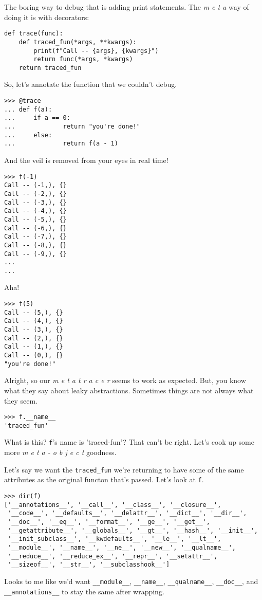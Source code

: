 \documentclass[11pt]{article}
\begin{document}
The boring way to debug that is adding print statements. The \emph{m e t
a} way of doing it is with decorators:
\begin{verbatim}
def trace(func):
    def traced_fun(*args, **kwargs):
        print(f"Call -- {args}, {kwargs}")
        return func(*args, *kwargs)
    return traced_fun
\end{verbatim}
So, let's annotate the function that we couldn't debug.
\begin{verbatim}
>>> @trace
... def f(a):
...     if a == 0:
...             return "you're done!"
...     else:
...             return f(a - 1)
\end{verbatim}
And the veil is removed from your eyes in real time!
\begin{verbatim}
>>> f(-1)
Call -- (-1,), {}
Call -- (-2,), {}
Call -- (-3,), {}
Call -- (-4,), {}
Call -- (-5,), {}
Call -- (-6,), {}
Call -- (-7,), {}
Call -- (-8,), {}
Call -- (-9,), {}
...
...
\end{verbatim}
Aha!
\begin{verbatim}
>>> f(5)
Call -- (5,), {}
Call -- (4,), {}
Call -- (3,), {}
Call -- (2,), {}
Call -- (1,), {}
Call -- (0,), {}
"you're done!"
\end{verbatim}

Alright, so our \emph{m e t a  t r a c e r} seems to work as
expected. But, you know what they say about leaky
abstractions. Sometimes things are not always what they seem.

\begin{verbatim}
>>> f.__name__
'traced_fun'
\end{verbatim}
What is this? \texttt{f}'s name is 'traced-fun'? That can't be right. Let's
cook up some more \emph{m e t a - o b j e c t} goodness.

Let's say we want the \texttt{traced\_fun} we're returning to have some of
the same attributes as the original functon that's passed. Let's
look at \texttt{f}.
\begin{verbatim}
>>> dir(f)
['__annotations__', '__call__', '__class__', '__closure__',
 '__code__', '__defaults__', '__delattr__', '__dict__', '__dir__',
 '__doc__', '__eq__', '__format__', '__ge__', '__get__',
 '__getattribute__', '__globals__', '__gt__', '__hash__', '__init__',
 '__init_subclass__', '__kwdefaults__', '__le__', '__lt__',
 '__module__', '__name__', '__ne__', '__new__', '__qualname__',
 '__reduce__', '__reduce_ex__', '__repr__', '__setattr__',
 '__sizeof__', '__str__', '__subclasshook__']
\end{verbatim}
Looks to me like we'd want \texttt{\_\_module\_\_}, \texttt{\_\_name\_\_}, \texttt{\_\_qualname\_\_},
\texttt{\_\_doc\_\_}, and \texttt{\_\_annotations\_\_} to stay the same after wrapping.
\end{document}
